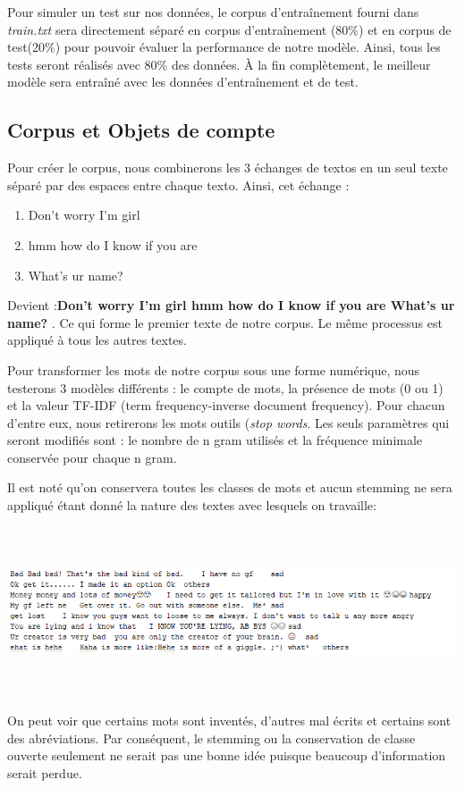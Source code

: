 \documentclass[12pt,french]{article}
\begin{document}
Pour simuler un test sur nos données, le corpus d'entraînement fourni dans \emph{train.txt} sera directement séparé en corpus d'entraînement (80\%) et en corpus de test(20\%)  pour pouvoir évaluer la performance de notre modèle. Ainsi, tous les tests seront réalisés avec 80\% des données. À la fin complètement, le meilleur modèle sera entraîné avec les données d'entraînement et de test.


\subsection*{Corpus et Objets de compte}
Pour créer le corpus, nous combinerons les 3 échanges de textos en un seul texte séparé par des espaces entre chaque texto. Ainsi, cet échange :
\begin{enumerate}
\item Don't worry  I'm girl
\item hmm how do I know if you are
\item What's ur name?
\end{enumerate}
Devient :\textbf{Don't worry  I'm girl hmm how do I know if you are  What's ur name?} . Ce qui forme le premier texte de notre corpus. Le même processus est appliqué à tous les autres textes.

Pour transformer les mots de notre corpus sous une forme numérique, nous testerons 3 modèles différents : le compte de mots, la présence de mots (0 ou 1) et la valeur TF-IDF (term frequency-inverse document frequency). Pour chacun d'entre eux, nous retirerons les mots outils (\emph{stop words}. Les seuls paramètres qui seront modifiés sont : le nombre de n gram utilisés et la fréquence minimale conservée pour chaque n gram.

Il est noté qu'on conservera toutes les classes de mots et aucun stemming ne sera appliqué étant donné la nature des textes avec lesquels on travaille:

\includegraphics[width=\linewidth,height=5cm]{exemples_text}

On peut voir que certains mots sont inventés, d'autres mal écrits et certains sont des abréviations. Par conséquent, le stemming ou la conservation de classe ouverte seulement ne serait pas une bonne idée puisque beaucoup d'information serait perdue.
\end{document}
